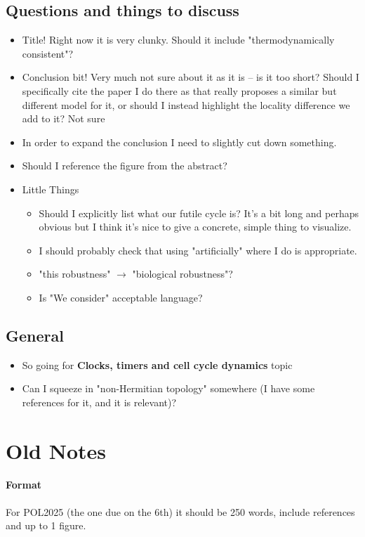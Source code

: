 \documentclass[11pt]{article}
\begin{document}
\subsection{Questions and things to discuss}
\begin{itemize}
	\item Title! Right now it is very clunky. Should it include "thermodynamically consistent"?
    \item Conclusion bit! Very much not sure about it as it is -- is it too short? Should I specifically cite the paper I do there as that really proposes a similar but different model for it, or should I instead highlight the locality difference we add to it? Not sure
    \item In order to expand the conclusion I need to slightly cut down something.
	\item Should I reference the figure from the abstract?
	\item Little Things \begin{itemize}
		      \item Should I explicitly list what our futile cycle is? It's a bit long and perhaps obvious but I think it's nice to give a concrete, simple thing to visualize.
              \item I should probably check that using "artificially" where I do is appropriate.
              \item "this robustness" $\rightarrow$ "biological robustness"?
              \item Is "We consider" acceptable language?
	      \end{itemize}
\end{itemize}

\subsection{General}
\begin{itemize}
	\item So going for \textbf{Clocks, timers and cell cycle dynamics} topic
	\item Can I squeeze in "non-Hermitian topology" somewhere (I have some references for it, and it is relevant)?
\end{itemize}

\newpage
\section{Old Notes}
\paragraph{Format}
For POL2025 (the one due on the 6th) it should be 250 words, include references and up to 1 figure.
\end{document}
